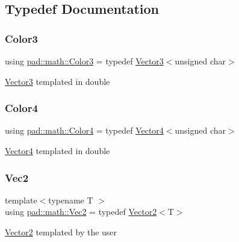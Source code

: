 \subsection{Typedef Documentation}
\mbox{\label{namespacepad_1_1math_ad0244d86222db9a7e50a7996b8328674}} 
\subsubsection{\texorpdfstring{Color3}{Color3}}
{\footnotesize\ttfamily using \mbox{\hyperlink{namespacepad_1_1math_ad0244d86222db9a7e50a7996b8328674}{pad\+::math\+::\+Color3}} = typedef \mbox{\hyperlink{structpad_1_1math_1_1_vector3}{Vector3}}$<$unsigned char$>$}

\mbox{\hyperlink{structpad_1_1math_1_1_vector3}{Vector3}} templated in double \mbox{\label{namespacepad_1_1math_af6a050aafcf279514a0beada2fb7a173}} 
\subsubsection{\texorpdfstring{Color4}{Color4}}
{\footnotesize\ttfamily using \mbox{\hyperlink{namespacepad_1_1math_af6a050aafcf279514a0beada2fb7a173}{pad\+::math\+::\+Color4}} = typedef \mbox{\hyperlink{structpad_1_1math_1_1_vector4}{Vector4}}$<$unsigned char$>$}

\mbox{\hyperlink{structpad_1_1math_1_1_vector4}{Vector4}} templated in double \mbox{\label{namespacepad_1_1math_a9773bcf81aa2ddd829bc327d822c6552}} 
\subsubsection{\texorpdfstring{Vec2}{Vec2}}
{\footnotesize\ttfamily template$<$typename T $>$ \\
using \mbox{\hyperlink{namespacepad_1_1math_a9773bcf81aa2ddd829bc327d822c6552}{pad\+::math\+::\+Vec2}} = typedef \mbox{\hyperlink{structpad_1_1math_1_1_vector2}{Vector2}}$<$T$>$}

\mbox{\hyperlink{structpad_1_1math_1_1_vector2}{Vector2}} templated by the user \mbox{\label{namespacepad_1_1math_abd85fd80e659deccc912cdeb3ac642c6}} 
